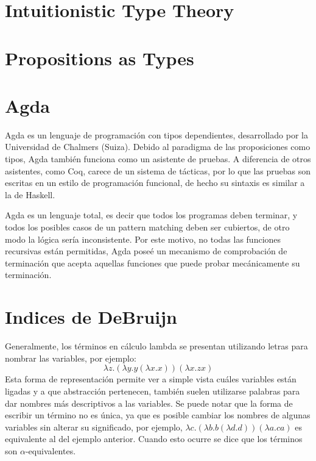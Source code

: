 \documentclass[]{report}
\begin{document}
	\section{Intuitionistic Type Theory}
	
	\section{Propositions as Types}
	
	
	\section{Agda}
	Agda es un lenguaje de programación con tipos dependientes, desarrollado por la Universidad de
	Chalmers (Suiza).
	Debido al paradigma de las proposiciones como tipos, Agda también funciona como un asistente de pruebas.
	A diferencia de otros asistentes, como Coq, carece de un sistema de tácticas, por lo que las pruebas son escritas en un estilo de programación funcional, de hecho su sintaxis es similar a la de Haskell.

	Agda es un lenguaje total, es decir que todos los programas deben terminar, y todos los posibles casos de un pattern matching deben ser cubiertos, de otro modo la lógica sería inconsistente.
	Por este motivo, no todas las funciones recursivas están permitidas, Agda poseé un mecanismo de comprobación de terminación que acepta aquellas funciones que puede probar mecánicamente su terminación.
	
	
	\section{Indices de DeBruijn}
	Generalmente, los términos en cálculo lambda se presentan utilizando letras para nombrar las variables, por ejemplo:
	\[ \lambda z. (\lambda y. y (\lambda x. x)) (\lambda x. z x) \]
	Esta forma de representación permite ver a simple vista cuáles variables están ligadas y a que abstracción pertenecen, también suelen utilizarse palabras para dar nombres más descriptivos a las variables.
	Se puede notar que la forma de escribir un término no es única, ya que es posible cambiar los nombres de algunas variables sin alterar su significado, por ejemplo, $\lambda c. (\lambda b. b (\lambda d. d)) (\lambda a. c a)$ es equivalente al del ejemplo anterior.
	Cuando esto ocurre se dice que los términos son $\alpha$-equivalentes.
	
\end{document}

